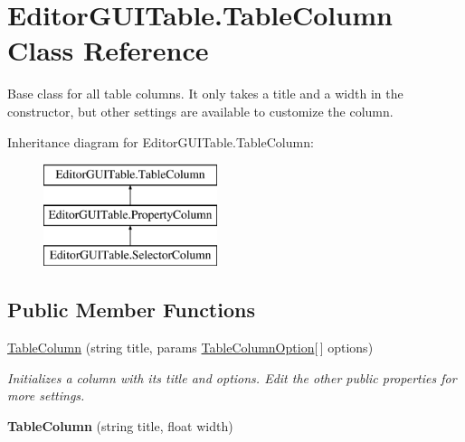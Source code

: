 \hypertarget{class_editor_g_u_i_table_1_1_table_column}{}\section{Editor\+G\+U\+I\+Table.\+Table\+Column Class Reference}
\label{class_editor_g_u_i_table_1_1_table_column}


Base class for all table columns. It only takes a title and a width in the constructor, but other settings are available to customize the column.  


Inheritance diagram for Editor\+G\+U\+I\+Table.\+Table\+Column\+:\begin{figure}[H]
\begin{center}
\leavevmode
\includegraphics[height=3.000000cm]{class_editor_g_u_i_table_1_1_table_column}
\end{center}
\end{figure}
\subsection*{Public Member Functions}
\begin{DoxyCompactItemize}
\item 
\mbox{\hyperlink{class_editor_g_u_i_table_1_1_table_column_adfb68a7994e1329ac769c79d9d5c332d}{Table\+Column}} (string title, params \mbox{\hyperlink{class_table_column_option}{Table\+Column\+Option}}\mbox{[}$\,$\mbox{]} options)
\begin{DoxyCompactList}\small\item\em Initializes a column with its title and options. Edit the other public properties for more settings. \end{DoxyCompactList}\item 
\mbox{\label{class_editor_g_u_i_table_1_1_table_column_a63ad9fb2478afb63febf24e9ed4d5890}} 
{\bfseries Table\+Column} (string title, float width)
\end{DoxyCompactItemize}

